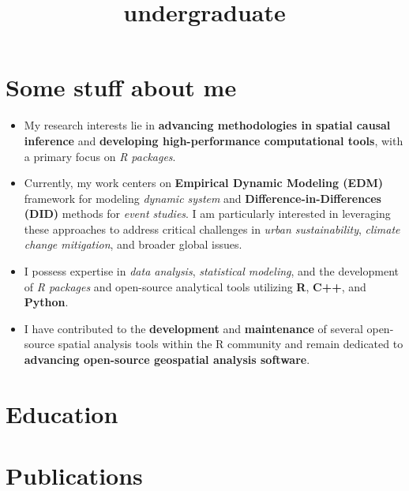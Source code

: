 \documentclass[11pt,a4paper,]{moderncv}
\title{undergraduate}
\providecommand{\tightlist}{%
	\setlength{\itemsep}{0pt}\setlength{\parskip}{0pt}}
\begin{document}
\makecvtitle



\section{Some stuff about me}\label{some-stuff-about-me}

\begin{itemize}
\tightlist
\item
  My research interests lie in \textbf{advancing methodologies in
  spatial causal inference} and \textbf{developing high-performance
  computational tools}, with a primary focus on \emph{R packages}.
\item
  Currently, my work centers on \textbf{Empirical Dynamic Modeling
  (EDM)} framework for modeling \emph{dynamic system} and
  \textbf{Difference-in-Differences (DID)} methods for \emph{event
  studies}. I am particularly interested in leveraging these approaches
  to address critical challenges in \emph{urban sustainability},
  \emph{climate change mitigation}, and broader global issues.
\item
  I possess expertise in \emph{data analysis}, \emph{statistical
  modeling}, and the development of \emph{R packages} and open-source
  analytical tools utilizing \textbf{R}, \textbf{C++}, and
  \textbf{Python}.
\item
  I have contributed to the \textbf{development} and
  \textbf{maintenance} of several open-source spatial analysis tools
  within the R community and remain dedicated to \textbf{advancing
  open-source geospatial analysis software}.
\end{itemize}

\section{Education}\label{education}

\nopagebreak

\section{Publications}\label{publications}
\end{document}
